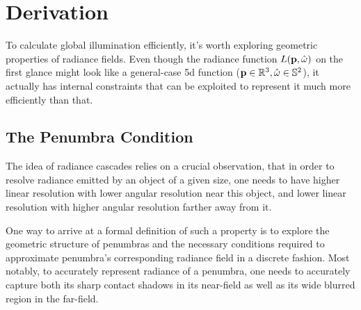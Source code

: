 \documentclass{jcgt}
\begin{document}
\section{Derivation}
To calculate global illumination efficiently, it's worth exploring geometric properties of radiance fields. Even though the radiance function $L(\textbf p, \hat \omega)$ on the first glance might look like a general-case 5d function ($\textbf p \in \mathbb{R}^3, \hat \omega \in \mathbb{S}^2$), it actually has internal constraints that can be exploited to represent it much more efficiently than that.


\subsection{The Penumbra Condition}
The idea of radiance cascades relies on a crucial observation, that in order to resolve radiance emitted by an object of a given size, one needs to have higher linear resolution with lower angular resolution near this object, and lower linear resolution with higher angular resolution farther away from it.

One way to arrive at a formal definition of such a property is to explore the geometric structure of penumbras and the necessary conditions required to approximate penumbra's corresponding radiance field in a discrete fashion. Most notably, to accurately represent radiance of a penumbra, one needs to accurately capture both its sharp contact shadows in its near-field as well as its
wide blurred region in the far-field.
\end{document}
